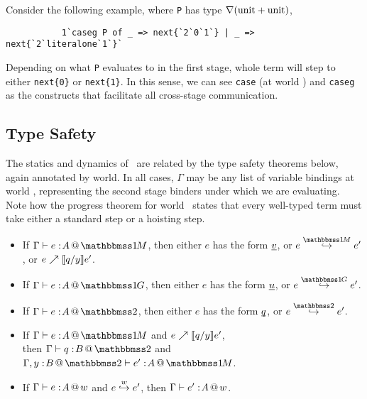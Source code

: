 Consider the following example, where {\tt P} has type $\nabla({\rm unit} + {\rm unit})$,\begin{lstlisting}
           1`caseg P of _ => next{`2`0`1`} | _ => next{`2`literalone`1`}`
\end{lstlisting}
Depending on what {\tt P} evaluates to in the first stage, whole term will step to either {\tt next\{0\}} or {\tt next\{1\}}.
In this sense, we can see {\tt case} (at world \bbonem) and {\tt caseg} as the constructs that facilitate
all cross-stage communication.

\subsection{Type Safety}

The statics and dynamics of \lang\ are related by the type safety theorems below, again annotated by world.
In all cases, $\Gamma$ may be any list of variable bindings at world \bbtwo,
representing the second stage binders under which we are evaluating.
Note how the progress theorem for world \bbonem\ states that every well-typed term must take 
either a standard step or a hoisting step.
\begin{abstrsyn}
\begin{theorem} [Progress]
\label{thm:progress} 
\vspace{-0.75em}
\begin{itemize} 
\item If $\typesone e A$, then either $e$ has the form $\underline{\smash{v}}$, or $\stepmix e {e'}$, or ${e}\nearrow \llbracket q/y \rrbracket{e'}$.
\item If $\typespure e A$, then either $e$ has the form $\underline{\smash{u}}$, or $\steppure e {e'}$.
\item If $\typestwo e A$, then either $e$ has the form $\underline{\smash{q}}$, or $\steptwo e {e'}$.
\end{itemize}
\end{theorem}
\begin{theorem} [Preservation]
\label{thm:preservation} 
\vspace{-0.75em}
\begin{itemize} 
\item If $\typesone e A$ and ${e}\nearrow \llbracket q/y \rrbracket{e'}$, \\
	then $\typestwo q B$ and \mbox{$\typesone [\Gamma,\coltwo y B] {e'} A$}.
\item If $\Gamma{} \vdash {e}:\!{A}~\hspace{-0.2em}\textsc{\textrm{@}}\hspace{-0.2em}~w$ and ${e}\overset{w}\hookrightarrow {e'}$, then $\Gamma{} \vdash {e'}:\!{A}~\hspace{-0.2em}\textsc{\textrm{@}}\hspace{-0.2em}~w$.
\end{itemize}
\end{theorem}
\end{abstrsyn}


